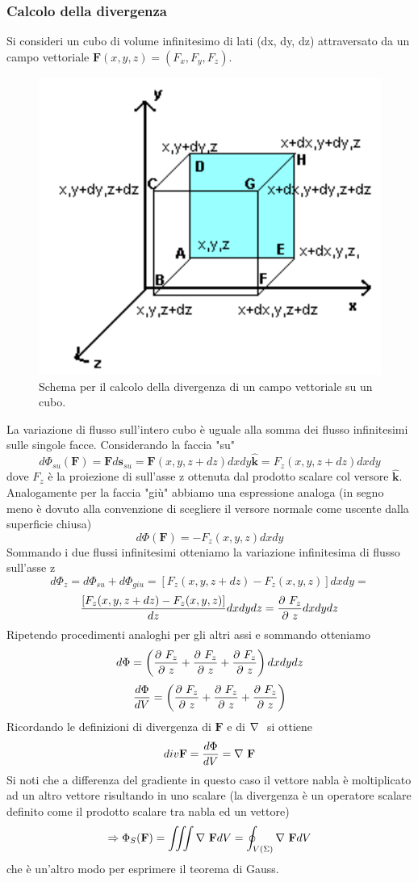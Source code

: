 \documentclass[
10pt, %
a4paper, %
oneside, %
headinclude,footinclude, %
BCOR5mm, %
]{scrartcl}
\begin{document}
\subsubsection{Calcolo della divergenza}
Si consideri un cubo di volume infinitesimo di lati (dx, dy, dz) attraversato da un campo vettoriale $\mathbf{F}(x,y,z) = (F_x, F_y, F_z)$.  
\begin{figure}[h!]
	\centering
	\includegraphics[width=0.6\linewidth]{images/div_quadrato}
	\caption{Schema per il calcolo della divergenza di un campo vettoriale su un cubo.}
	\label{fig:divquadrato}
\end{figure}
\FloatBarrier
La variazione di flusso sull'intero cubo è uguale alla somma dei flusso infinitesimi sulle singole facce. Considerando la faccia "su"
\[d\Phi_{su}(\mathbf{F}) = \mathbf{F}d\mathbf{s}_{su} = \mathbf{F}(x, y, z + dz)dxdy\hat{\mathbf{k}}=F_z(x, y, z + dz)dxdy\]
dove \(F_z\) è la proiezione di sull'asse z ottenuta dal prodotto scalare col versore \(\hat{\mathbf{k}}\). 
Analogamente per la faccia "giù" abbiamo una espressione analoga (in segno meno è dovuto alla convenzione di scegliere il versore normale come uscente dalla superficie chiusa)
\[d\Phi(\mathbf{F}) = -F_z(x, y, z)dxdy\]
Sommando i due flussi infinitesimi otteniamo la variazione infinitesima di flusso sull'asse z
\[d\Phi_z= d\Phi_{su}+d\Phi_{giu}=\left[F_z(x,y,z+dz)-F_z(x,y,z)\right]dxdy=\]
\[\frac{\left[F_z(x,y,z+dz)-F_z(x,y,z)\right]}{dz}dxdydz=\frac{\partial\  F_z}{\partial\  z}dxdydz\]
Ripetendo procedimenti analoghi per gli altri assi e sommando otteniamo
\[d\Phi = \left(\frac{\partial\  F_z}{\partial\  z}+ \frac{\partial\  F_z}{\partial\  z}+ \frac{\partial\  F_z}{\partial\  z}\right)dxdydz \]
\[\frac{d\Phi}{dV} = \left(\frac{\partial\  F_z}{\partial\  z}+ \frac{\partial\  F_z}{\partial\  z}+ \frac{\partial\  F_z}{\partial\  z}\right)\]
Ricordando le definizioni di divergenza di $\mathbf{F}$ e di \(\mathbf{\nabla\ }\) si ottiene
\[div\mathbf{F} = \frac{d\Phi}{dV} = \mathbf{\nabla\ }\mathbf{F}\]
Si noti che a differenza del gradiente in questo caso il vettore nabla è moltiplicato ad un altro vettore risultando in uno scalare (la divergenza è un operatore scalare definito come il prodotto scalare tra nabla ed un vettore)
\[\Rightarrow \Phi_S(\mathbf{F}) = \iiint \mathbf{\nabla\ }\mathbf{F}dV = \oint_{V(\Sigma)} \mathbf{\nabla\ }\mathbf{F}dV\]
che è un'altro modo per esprimere il teorema di Gauss.
\end{document}
